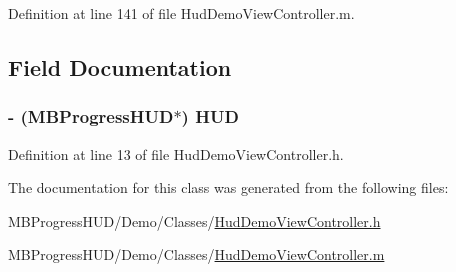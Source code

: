 Definition at line 141 of file HudDemoViewController.m.



\subsection{Field Documentation}
\hypertarget{interface_hud_demo_view_controller_a62209f8d829db91e9c588dee85158379}{
\subsubsection[{HUD}]{\setlength{\rightskip}{0pt plus 5cm}-\/ ({\bf MBProgressHUD}$\ast$) {\bf HUD}}}
\label{interface_hud_demo_view_controller_a62209f8d829db91e9c588dee85158379}


Definition at line 13 of file HudDemoViewController.h.



The documentation for this class was generated from the following files:\begin{DoxyCompactItemize}
\item 
MBProgressHUD/Demo/Classes/\hyperlink{_hud_demo_view_controller_8h}{HudDemoViewController.h}\item 
MBProgressHUD/Demo/Classes/\hyperlink{_hud_demo_view_controller_8m}{HudDemoViewController.m}\end{DoxyCompactItemize}
